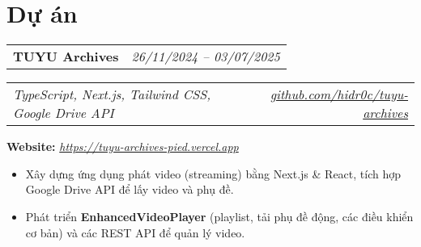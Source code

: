 \documentclass[a4paper,11pt]{article}
\begin{document}
\section{Dự án}
\begin{spacing}{1.05}
\begin{minipage}[t]{\linewidth}
  \begin{tabularx}{\linewidth}{@{}l r@{}}
    \textbf{TUYU Archives} & \hspace*{0.63\linewidth}\normalsize\textit{26/11/2024 -- 03/07/2025} \\
  \end{tabularx}
  \begin{tabularx}{\linewidth}{@{}l r@{}}
  \normalsize\textit {TypeScript, Next.js, Tailwind CSS, Google Drive API}& \hspace*{0.255\linewidth}\href{https://github.com/hidr0c/tuyu-archives}{\normalsize\textit{github.com/hidr0c/tuyu-archives}}\\
  \end{tabularx}
  \textbf{Website:} \href{https://tuyu-archives-pied.vercel.app}{\normalsize\textit{https://tuyu-archives-pied.vercel.app}}  
  \begin{itemize}[nosep,leftmargin=1.2em,itemsep=2pt]
  \item Xây dựng ứng dụng phát video (streaming) bằng Next.js \& React, tích hợp Google Drive API để lấy video và phụ đề.
  \item Phát triển \textbf{EnhancedVideoPlayer} (playlist, tải phụ đề động, các điều khiển cơ bản) và các REST API để quản lý video.
  \end{itemize}
\end{minipage}

\vspace{0.5em}


\end{spacing}
\end{document}
